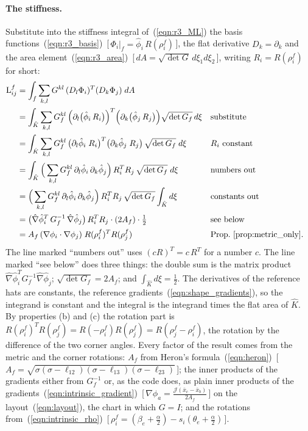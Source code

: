 \paragraph{The stiffness.} Substitute into the stiffness integral of~(\ref{eqn:r3_ML}) the basis functions~(\ref{eqn:r3_basis})~[\,$\Phi_i|_f = \hat\phi_i\,R(\rho_i^f)$\,], the flat derivative $D_k = \partial_k$ and the area element~(\ref{eqn:r3_area})~[\,$dA = \sqrt{\det G}\,d\xi_1d\xi_2$\,], writing $R_i = R(\rho_i^f)$ for short:
\begin{align*}
\mathrm L^f_{ij} &= \int_f \sum_{k,l} G^{kl}\, (D_l\Phi_i)^T(D_k\Phi_j)\; dA \\
&= \int_{\hat K} \sum_{k,l} G_f^{kl}\, \Big(\partial_l\big(\hat\phi_i\, R_i\big)\Big)^T\Big(\partial_k\big(\hat\phi_j\, R_j\big)\Big) \sqrt{\det G_f}\, d\xi && \text{substitute} \\
&= \int_{\hat K} \sum_{k,l} G_f^{kl}\, \big(\partial_l\hat\phi_i\; R_i\big)^T\big(\partial_k\hat\phi_j\; R_j\big)\, \sqrt{\det G_f}\; d\xi && R_i \text{ constant} \\
&= \int_{\hat K} \Big(\sum_{k,l} G_f^{kl}\,\partial_l\hat\phi_i\,\partial_k\hat\phi_j\Big)\, R_i^TR_j\, \sqrt{\det G_f}\; d\xi && \text{numbers out} \\
&= \Big(\sum_{k,l} G_f^{kl}\,\partial_l\hat\phi_i\,\partial_k\hat\phi_j\Big)\, R_i^TR_j\, \sqrt{\det G_f}\int_{\hat K} d\xi && \text{constants out} \\
&= \big(\hat\nabla\hat\phi_i^T\, G_f^{-1}\, \hat\nabla\hat\phi_j\big)\, R_i^TR_j\cdot (2A_f)\cdot\tfrac12 && \text{see below} \\
&= A_f\,(\nabla\phi_i\cdot\nabla\phi_j)\; R(\rho_i^f)^TR(\rho_j^f) && \text{Prop.~\ref{prop:metric_only}.}
\end{align*}
The line marked ``numbers out'' uses $(cR)^T = c\,R^T$ for a number $c$. The line marked ``see below'' does three things: the double sum is the matrix product $\hat\nabla\hat\phi_i^T G_f^{-1}\hat\nabla\hat\phi_j$; $\sqrt{\det G_f} = 2A_f$; and $\int_{\hat K}d\xi = \frac12$. The derivatives of the reference hats are constants, the reference gradients~(\ref{eqn:shape_gradients}), so the integrand is constant and the integral is the integrand times the flat area of $\hat K$. By properties (b) and (c) the rotation part is $R(\rho_i^f)^TR(\rho_j^f) = R(-\rho_i^f)R(\rho_j^f) = R(\rho_j^f - \rho_i^f)$, the rotation by the difference of the two corner angles. Every factor of the result comes from the metric and the corner rotations: $A_f$ from Heron's formula~(\ref{eqn:heron})~[\,$A_f = \sqrt{\sigma(\sigma - \ell_{12})(\sigma - \ell_{13})(\sigma - \ell_{23})}$\,]; the inner products of the gradients either from $G_f^{-1}$ or, as the code does, as plain inner products of the gradients~(\ref{eqn:intrinsic_gradient})~[\,$\nabla\phi_a = \frac{\mathcal J(\bar x_c - \bar x_b)}{2A_f}$\,] on the layout~(\ref{eqn:layout}), the chart in which $G = I$; and the rotations from~(\ref{eqn:intrinsic_rho})~[\,$\rho_i^f = (\beta_e + \tfrac\alpha2) - s_i(\theta_e + \tfrac\alpha2)$\,].

